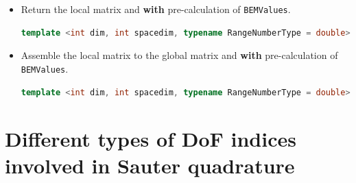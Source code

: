 \documentclass[11pt, a4paper]{book}
\begin{document}
\begin{itemize}
\begin{itemize}
\begin{lstlisting}[language=C++]
    \end{lstlisting}
  \item Return the local matrix and \textbf{with} pre-calculation of \texttt{BEMValues}.
    \begin{lstlisting}[language=C++]
      template <int dim, int spacedim, typename RangeNumberType = double> FullMatrix<RangeNumberType> SauterQuadRule( const LaplaceKernel::KernelFunction<spacedim, RangeNumberType> & kernel_function, const BEMValues<dim, spacedim> & bem_values, const typename DoFHandler<dim, spacedim>::cell_iterator &kx_cell_iter, const typename DoFHandler<dim, spacedim>::cell_iterator &ky_cell_iter, const MappingQGeneric<dim, spacedim> & kx_mapping = MappingQGeneric<dim, spacedim>(1), const MappingQGeneric<dim, spacedim> &ky_mapping = MappingQGeneric<dim, spacedim>(1))
    \end{lstlisting}
  \item Assemble the local matrix to the global matrix and \textbf{with} pre-calculation of
    \texttt{BEMValues}.
    \begin{lstlisting}[language=C++]
      template <int dim, int spacedim, typename RangeNumberType = double> void SauterQuadRule( FullMatrix<RangeNumberType> &system_matrix, const LaplaceKernel::KernelFunction<spacedim, RangeNumberType> & kernel_function, const BEMValues<dim, spacedim> & bem_values, const typename DoFHandler<dim, spacedim>::cell_iterator &kx_cell_iter, const typename DoFHandler<dim, spacedim>::cell_iterator &ky_cell_iter, const MappingQGeneric<dim, spacedim> & kx_mapping = MappingQGeneric<dim, spacedim>(1), const MappingQGeneric<dim, spacedim> &ky_mapping = MappingQGeneric<dim, spacedim>(1))
    \end{lstlisting}
  \end{itemize}
\end{itemize}

\section{Different types of DoF indices involved in Sauter quadrature}
\end{document}
